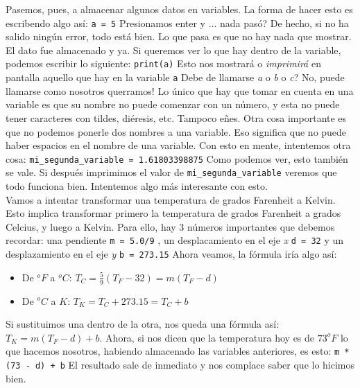 \documentclass[10pt,letterpaper]{article}
\newcommand{\inlinecode}[1]{
\colorbox{light-gray}{\texttt{#1}}
}
\begin{document}
Pasemos, pues, a almacenar algunos datos en variables. La forma de hacer esto es escribendo algo as\'i: \inlinecode{a = 5} Presionamos enter y ... nada pas\'o? De hecho, si no ha salido ning\'un error, todo est\'a bien. Lo que pasa es que no hay nada que mostrar. El dato fue almacenado y ya. Si queremos ver lo que hay dentro de la variable, podemos escribir lo siguiente: \inlinecode{print(a)} Esto nos mostrar\'a o \emph{imprimir\'a} en pantalla aquello que hay en la variable \inlinecode{a} Debe de llamarse \emph{a} o \emph{b} o \emph{c}? No, puede llamarse como nosotros querramos! Lo \'unico que hay que tomar en cuenta en una variable es que su nombre no puede comenzar con un n\'umero, y esta no puede tener caracteres con tildes, di\'eresis, etc. Tampoco e\~nes. Otra cosa importante es que no podemos ponerle dos nombres a una variable. Eso significa que no puede haber espacios en el nombre de una variable. Con esto en mente, intentemos otra cosa: \inlinecode{mi\_segunda\_variable = 1.61803398875} Como podemos ver, esto tambi\'en se vale. Si despu\'es imprimimos el valor de \inlinecode{mi\_segunda\_variable} veremos que todo funciona bien. Intentemos algo m\'as interesante con esto.\\

Vamos a intentar transformar una temperatura de grados Farenheit a Kelvin. Esto implica transformar primero la temperatura de grados Farenheit a grados Celcius, y luego a Kelvin. Para ello, hay 3 n\'umeros importantes que debemos recordar: una pendiente \inlinecode{m = 5.0/9}, un desplacamiento en el eje \emph{x} \inlinecode{d = 32} y un desplazamiento en el eje \emph{y} \inlinecode{b = 273.15} Ahora veamos, la f\'ormula ir\'ia algo as\'i:

\begin{itemize}
\item De $^o F$ a $^o C$:\hspace*{1cm} $T_{C} = \frac{5}{9} \left( T_{F} - 32 \right) = m \left( T_{F} - d \right)$
\item De $^o C$ a $K$:\hspace*{1cm} $T_{K} = T_{C} + 273.15 = T_{C} + b$
\end{itemize}

Si sustituimos una dentro de la otra, nos queda una f\'ormula as\'i: $T_{K} = m \left( T_{F} - d \right) + b$. Ahora, si nos dicen que la temperatura hoy es de $73^o F$ lo que hacemos nosotros, habiendo almacenado las variables anteriores, es esto: \inlinecode{m * (73 - d) + b} El resultado sale de inmediato y nos complace saber que lo hicimos bien.\\
\end{document}
